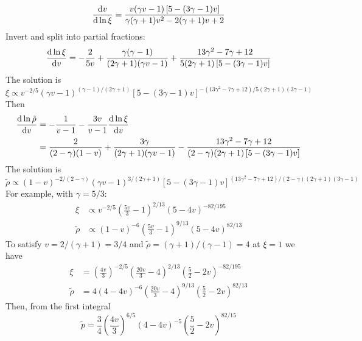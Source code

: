 \documentclass{jknotes}
\begin{document}
\begin{equation}
	\frac{\diffd v}{\diffd \ln \xi} = \frac{v(\gamma v -
		1) \left[5-(3\gamma-1)v\right]}{\gamma (\gamma+1) v^2 - 2(\gamma +1)v
	+ 2}
\end{equation}
Invert and split into partial fractions:
\begin{equation}
\frac{\diffd \ln \xi}{\diffd v} = -\frac{2}{5v} + \frac{\gamma(\gamma
	-1)}{(2\gamma +1)(\gamma v - 1)} + \frac{13\gamma^2 -7\gamma +
	12}{5(2\gamma +1)\left[5-(3\gamma -1)v\right]}
\end{equation}
The solution is
\begin{equation}
	\xi \propto v^{-2/5} (\gamma v-1)^{(\gamma -1)/(2\gamma +1)}
	\left[5-(3\gamma-1)v\right]^{-(13\gamma^2-7\gamma+12)/5(2\gamma
	+1)(3\gamma -1)}
\end{equation}
Then
\begin{align}
	\frac{\diffd \ln \tilde{\rho}}{\diffd v} &= -\frac{1}{v-1} -
	\frac{3v}{v-1}\frac{\diffd \ln \xi}{\diffd v}  \\
	&= \frac{2}{(2-\gamma)(1-v)} + \frac{3\gamma}{(2\gamma+1)(\gamma v-1)} -
	\frac{13\gamma^2 - 7\gamma +12}{(2-\gamma)(2\gamma+1) \left[5-(3\gamma
	-1)v\right]}
\end{align}
The solution is
\begin{equation}
	\tilde{\rho} \propto (1-v)^{-2/(2-\gamma)}(\gamma
	v-1)^{3/(2\gamma+1)}\left[5-(3\gamma-1)v\right]^{
	(13\gamma^2-7\gamma+12)/(2-\gamma)(2\gamma
	+1)(3\gamma -1)}
\end{equation}
For example, with $\gamma =5/3$:
\begin{align}
	\xi &\propto v^{-2/5} \left(\frac{5v}{3}-1\right)^{2/13}
	\left(5-4v\right)^{-82/195} \\
	\tilde{\rho} &\propto
	(1-v)^{-6}\left(\frac{5v}{3}-1\right)^{9/13}(5-4v)^{82/13}
\end{align}
To satisfy $v=2/(\gamma+1) = 3/4$ and $\tilde{\rho} = (\gamma+1)/(\gamma-1) =
4$ at $\xi = 1$ we have
\begin{align}
	\xi &= \left(\frac{4v}{3}\right)^{-2/5} \left(\frac{20v}{3}-4\right)^{2/13}
	\left(\frac{5}{2}-2v\right)^{-82/195} \\
	\tilde{\rho} &=
	4(4-4v)^{-6}\left(\frac{20v}{3}-4\right)^{9/13}(\frac{5}{2}-2v)^{82/13}
\end{align}
Then, from the first integral
\begin{equation}
	\tilde{p} =
	\frac{3}{4}\left(\frac{4v}{3}\right)^{6/5}(4-4v)^{-5}\left(\frac{5}{2}-2v\right)^{82/15}
\end{equation}
\end{document}
